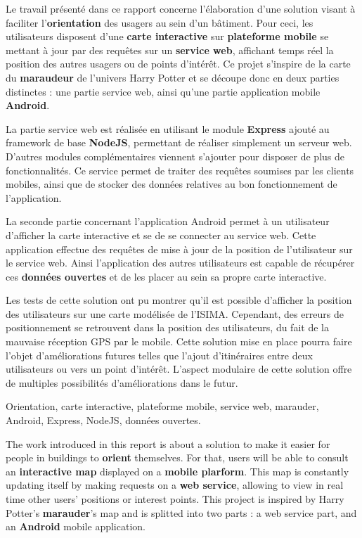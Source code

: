 

Le travail présenté dans ce rapport concerne l'élaboration d'une solution visant à faciliter l’\textbf{orientation} des usagers au sein d'un bâtiment. Pour ceci, les utilisateurs disposent d'une \textbf{carte interactive} sur \textbf{plateforme mobile} se mettant à jour par des requêtes sur un \textbf{service web}, affichant temps réel la position des autres usagers ou de points d’intérêt. Ce projet s’inspire de la carte du \textbf{maraudeur} de l’univers Harry Potter et se découpe donc en deux parties distinctes : une partie service web, ainsi qu'une partie application mobile \textbf{Android}.

La partie service web est réalisée en utilisant le module \textbf{Express} ajouté au framework de base \textbf{NodeJS}, permettant de réaliser simplement un serveur web. D'autres modules complémentaires viennent s'ajouter pour disposer de plus de fonctionnalités. Ce service permet de traiter des requêtes soumises par les clients mobiles, ainsi que de stocker des données relatives au bon fonctionnement de l'application.

La seconde partie concernant l'application Android permet à un utilisateur d’afficher la carte interactive et se de se connecter au service web. Cette application effectue des requêtes de mise à jour de la position de l'utilisateur sur le service web. Ainsi l’application des autres utilisateurs est capable de récupérer ces \textbf{données ouvertes} et de les placer au sein sa propre carte interactive.

Les tests de cette solution ont pu montrer qu'il est possible d'afficher la position des utilisateurs sur une carte modélisée de l'ISIMA. Cependant, des erreurs de positionnement se retrouvent dans la position des utilisateurs, du fait de la mauvaise réception GPS par le mobile. Cette solution mise en place pourra faire l'objet d'améliorations futures telles que l'ajout d'itinéraires entre deux utilisateurs ou vers un point d'intérêt. L'aspect modulaire de cette solution offre de multiples possibilités d'améliorations dans le futur.

Orientation, carte interactive, plateforme mobile, service web, marauder, Android, Express, NodeJS, données ouvertes.



The work introduced in this report is about a solution to make it easier for people in buildings to \textbf{orient} themselves. For that, users will be able to consult an \textbf{interactive map} displayed on a \textbf{mobile plarform}. This map is constantly updating itself by making requests on a \textbf{web service}, allowing to view in real time other users' positions or interest points. This project is inspired by Harry Potter's \textbf{marauder}'s map and is splitted into two parts : a web service part, and an \textbf{Android} mobile application.

